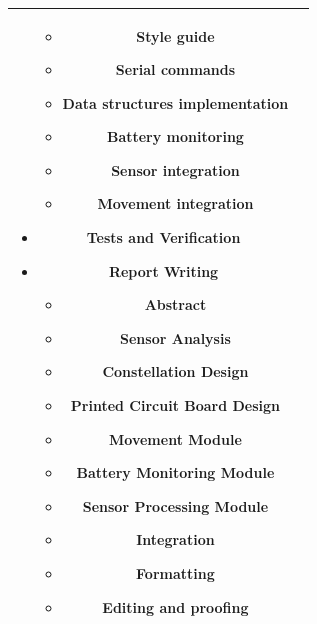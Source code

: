 \documentclass[conference]{IEEEtran}
\begin{document}
\begin{tabularx}{\linewidth}{ | c | X | }
\begin{itemize}
\begin{itemize}
			      \item Style guide
			      \item Serial commands
			      \item Data structures implementation
			      \item Battery monitoring
			      \item Sensor integration
			      \item Movement integration
		      \end{itemize}
		        \item Tests and Verification
		        \item Report Writing
		              \begin{itemize}
			      \item Abstract
			      \item Sensor Analysis
			      \item Constellation Design
			      \item Printed Circuit Board Design
			      \item Movement Module
			      \item Battery Monitoring Module
			      \item Sensor Processing Module
			      \item Integration
			      \item Formatting
			      \item Editing and proofing
		      \end{itemize}
	        \end{itemize} \\
	\hline
\end{tabularx}
\end{document}
